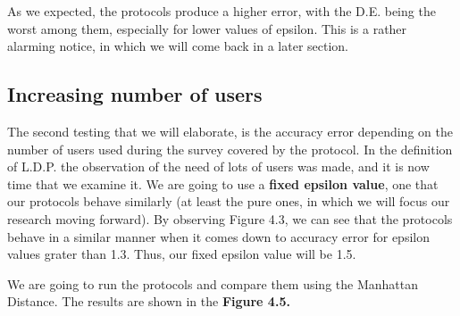 As we expected, the protocols produce a higher error, with the D.E. being the worst among them, especially for lower values of epsilon. This is a rather alarming notice, in which we will come back in a later section.


\subsection{Increasing number of users}


The second testing that we will elaborate, is the accuracy error depending on the number of users used during the survey covered by the protocol. In the definition of L.D.P. the observation of the need of lots of users was made, and it is now time that we examine it. We are going to use a \textbf{fixed epsilon value}, one that our protocols behave similarly (at least the pure ones, in which we will focus our research moving forward). By observing Figure 4.3, we can see that the protocols behave in a similar manner when it comes down to accuracy error for epsilon values grater than 1.3. Thus, our fixed epsilon value will be 1.5.

We are going to run the protocols and compare them using the Manhattan Distance. The results are shown in the \textbf{Figure 4.5.}



